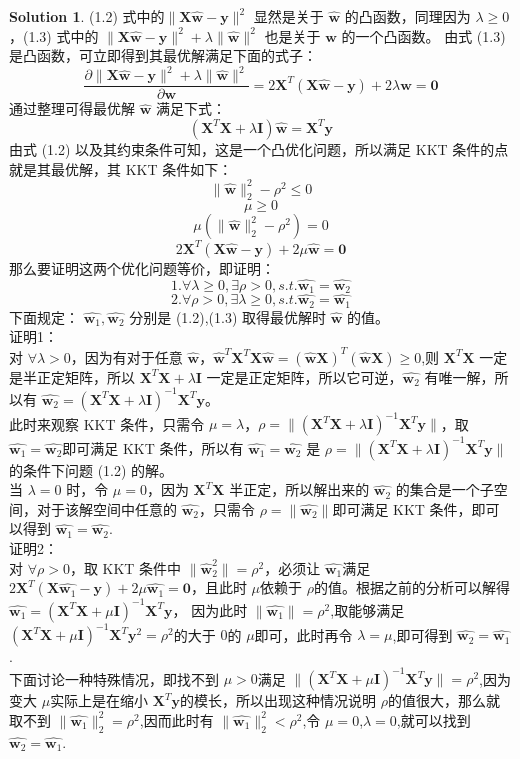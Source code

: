 \documentclass[a4paper]{article}
\numberwithin{equation}{section}
\theoremstyle{definition}
\newtheorem*{solution}{Solution}
\def \I {\mathbf{I}}
\def \X {\mathbf{X}}
\def \w {\bm{w}}
\def \y {\bm{y}}
\begin{document}
\begin{solution}
(1.2) 式中的$\|\X\hat{\w} - \y\|^2$ 显然是关于 $\hat{\w}$ 的凸函数，同理因为 $\lambda \geq 0$，(1.3) 式中的 $\|\X\hat{\w} - \y\|^2 + \lambda\|\hat{\w}\|^2$ 也是关于 $\hat{\w}$ 的一个凸函数。
由式 (1.3) 是凸函数，可立即得到其最优解满足下面的式子：
$$
\frac{\partial\|\X\hat{\w} - \y\|^2 + \lambda\|\hat{\w}\|^2}{\partial \w} = 2\X^T(\X\hat{\w} - \y) + 2\lambda \w = \textbf{0}
$$
通过整理可得最优解 $\hat{\w}$ 满足下式：
$$(\X^T\X+\lambda\I)\hat{\w}=\X^T\y$$
由式 (1.2) 以及其约束条件可知，这是一个凸优化问题，所以满足 KKT 条件的点就是其最优解，其 KKT 条件如下：
$$
\| \hat{\w} \|_{2}^{2} - \rho^2 \leq 0 $$
$$ 
\mu \geq 0$$
$$
\mu(\|\hat{\w}\|_{2}^{2} - \rho^2) = 0 $$ 
$$
2\X^T(\X\hat{\w} - \y) + 2\mu \hat{\w} = \textbf{0}
$$
那么要证明这两个优化问题等价，即证明：
$$1.\forall\lambda \geq 0,\exists\rho > 0,s.t.\hat{\w_{1}} = \hat{\w_{2}}$$
$$2.\forall\rho > 0,\exists\lambda \geq 0,s.t.\hat{\w_{2}} = \hat{\w_{1}}
$$
下面规定： $\hat{\w_{1}}, \hat{\w_{2}}$ 分别是 (1.2),(1.3) 取得最优解时 $\hat{\w}$ 的值。\\
证明1：\\
对 $\forall\lambda > 0$，因为有对于任意 $\hat{\w}$，$\hat{\w}^T \X^T \X\hat{\w} = (\hat{\w}\X)^T (\hat{\w}\X) \geq 0$,则 $\X^T\X$ 一定是半正定矩阵，所以 $\X^T \X + \lambda \I$ 一定是正定矩阵，所以它可逆，$\hat{\w_{2}}$ 有唯一解，所以有 $\hat{\w_{2}} = (\X^T \X + \lambda \I)^{-1}\X^T \y$。\\
此时来观察 KKT 条件，只需令 $\mu = \lambda$，$\rho = \|(\X^T\X + \lambda \I)^{-1}\X^T \y\|$，取 $\hat{\w_{1}}= \hat{\w_{2}}$即可满足 KKT 条件，所以有 $\hat{\w_{1}}= \hat{\w_{2}}$ 是 $\rho = \|(\X^T\X + \lambda \I)^{-1}\X^T \y\|$ 的条件下问题 (1.2) 的解。\\
当 $\lambda = 0$ 时，令 $\mu = 0$，因为 $\X^T\X$ 半正定，所以解出来的 $\hat{\w_{2}}$ 的集合是一个子空间，对于该解空间中任意的 $\hat{\w_{2}}$，只需令 $\rho = \|\hat{\w_{2}}\|$即可满足 KKT 条件，即可以得到 $\hat{\w_{1}}= \hat{\w_{2}}$.\\
证明2：\\
对 $\forall\rho > 0$，取 KKT 条件中 $\|\hat{\w} _{2}^{2}\| = \rho^2$，必须让 $\hat{\w_{1}}$满足 $2\X^T (\X\hat{\w_{1}} - \y) + 2\mu \hat{\w_{1}} = \textbf{0}$，且此时 $\mu$依赖于 $\rho$的值。根据之前的分析可以解得 $\hat{\w_{1}} = (\X^T \X + \mu \I)^{-1}\X^T \y$， 因为此时 $\|\hat{\w_{1}}\| = \rho^2$,取能够满足 $(\X^T\X + \mu \I)^{-1}\X^T\y^2 = \rho^2$的大于 $0$的 $\mu$即可，此时再令 $\lambda = \mu$,即可得到 $\hat{\w_{2}}= \hat{\w_{1}}$.\\
下面讨论一种特殊情况，即找不到 $\mu > 0$满足 $\|(\X^T \X + \mu \I)^{-1} \X^T\y \| = \rho^2$,因为变大 $\mu$实际上是在缩小 $\X^T\y$的模长，所以出现这种情况说明 $\rho$的值很大，那么就取不到 $\|\hat{\w_{1}}\|_{2}^{2} = \rho^2$,因而此时有 $\|\hat{\w_{1}}\|_{2}^{2} < \rho^2$,令 $\mu = 0$,$\lambda = 0$,就可以找到 $\hat{\w_{2}}= \hat{\w_{1}}$.\\

\end{solution}
\end{document}
